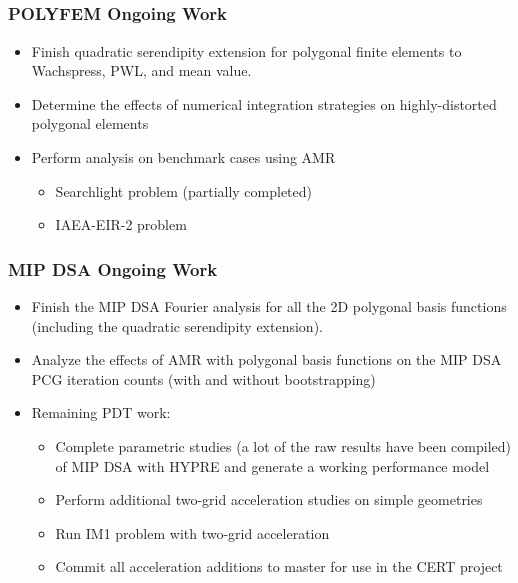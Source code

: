 \documentclass[compress,10pt]{beamer}
\begin{document}
\subsection{}
\begin{frame}[t]\frametitle{POLYFEM Ongoing Work}
\begin{block}{}{\large
\begin{itemize}
	\item Finish quadratic serendipity extension for polygonal finite elements to Wachspress, PWL, and mean value.
	\item Determine the effects of numerical integration strategies on highly-distorted polygonal elements
	\item Perform analysis on benchmark cases using AMR
	\begin{itemize}
		\item Searchlight problem (partially completed)
		\item IAEA-EIR-2 problem
	\end{itemize}
\end{itemize}
}\end{block}
\end{frame}
\begin{frame}[t]\frametitle{MIP DSA Ongoing Work}
\begin{block}{}{\large
\begin{itemize}
	\item Finish the MIP DSA Fourier analysis for all the 2D polygonal basis functions (including the quadratic serendipity extension).
	\item Analyze the effects of AMR with polygonal basis functions on the MIP DSA PCG iteration counts (with and without bootstrapping)
	\item Remaining PDT work:
	\begin{itemize}
		\item Complete parametric studies (a lot of the raw results have been compiled) of MIP DSA with HYPRE and generate a working performance model
		\item Perform additional two-grid acceleration studies on simple geometries
		\item Run IM1 problem with two-grid acceleration 
		\item Commit all acceleration additions to master for use in the CERT project
	\end{itemize}
\end{itemize}
}\end{block}
\end{frame}
\typeout{***********************************************************************************}
\end{document}
